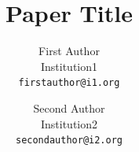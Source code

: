 \documentclass[10pt,twocolumn,letterpaper]{article}
\title{Paper Title}
\author{First Author\\
Institution1\\
{\tt\small firstauthor@i1.org}
\and
Second Author\\
Institution2\\
{\tt\small secondauthor@i2.org}
}
\begin{document}
\maketitle






{
    \small
    
    
}
\end{document}

